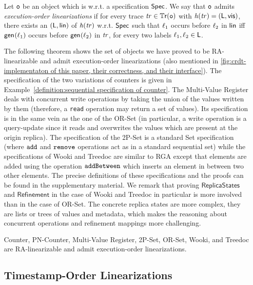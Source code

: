 \begin{definition}\label{def:exec_order}
  Let $\mathtt{o}$ be an object which is \crdtlinearizable{} w.r.t. a specification $\mathsf{Spec}$. We say that $\mathtt{o}$ admits \emph{execution-order linearizations} if for every trace $\mathit{tr}\in\mathbb{T}\mathsf{r}(\mathtt{o})$ with $\mathit{h}({\mathit{tr})}=(\mathsf{L},\mathsf{vis})$, there exists an \crdtlinearization{} $(\mathsf{L},\mathsf{lin})$ of $\mathit{h}({\mathit{tr})}$ w.r.t. $\mathsf{Spec}$ such that $\ell_1$ occurs before $\ell_2$ in $\mathsf{lin}$ iff $\mathsf{gen}_{}(\ell_1)$ occurs before $\mathsf{gen}_{}(\ell_2)$ in $\mathit{tr}$, for every two labels $\ell_1,\ell_2\in\mathsf{L}$.
\end{definition}

The following theorem shows the set of objects we have proved to be
RA-linearizable and admit execution-order linearizations (also
mentioned in \autoref{fig:crdt-implementaton of this paper, their
  correctness, and their interface}). The specification of the two
variations of counters is given in Example~\ref{definition:sequential
  specification of counter}. The Multi-Value Register deals with
concurrent write operations by taking the union of the values written
by them (therefore, a {\tt read} operation may return a set of
values).
Its specification is in the same vein as the one of the OR-Set (in particular, a write operation is a query-update since it reads and overwrites the values which are present at the origin replica). The specification of the 2P-Set is a standard Set specification (where ${\tt add}$ and ${\tt remove}$ operations act as in a standard sequential set) while the specifications of Wooki and Treedoc are similar to RGA except that elements are added using the operation ${\tt addBetween}$ which inserts an element in between two other elements. The precise definitions of these specifications and the proofs can be found in the supplementary material. We remark that proving $\mathsf{ReplicaStates}$ and $\mathsf{Refinement}$ in the case of Wooki and Treedoc in particular is more involved than in the case of OR-Set. The concrete replica states are more complex, they are lists or trees of values and metadata, which makes the reasoning about concurrent operations and refinement mappings more challenging.
\begin{theorem}\label{th:execution_order_objects}
Counter, PN-Counter, Multi-Value Register, 2P-Set, OR-Set, Wooki, and Treedoc are RA-linearizable and admit execution-order linearizations.
\end{theorem}

\subsection{Timestamp-Order Linearizations}
\label{subsec:time-stamp order as linearizabtion}

